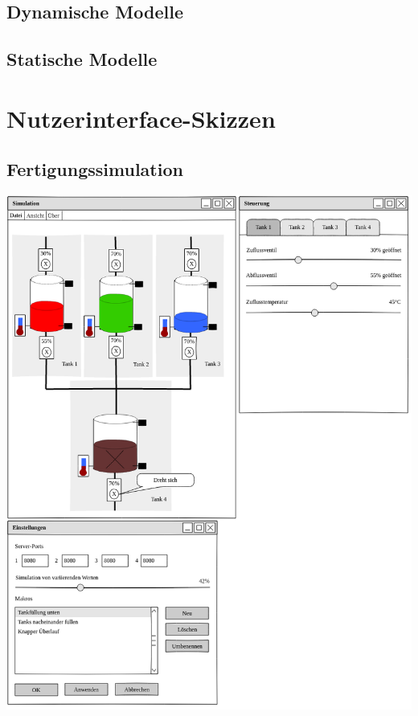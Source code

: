 \documentclass[parskip=full]{scrartcl}
\begin{document}
\subsection{Dynamische Modelle}
\Blindtext[1]

\subsection{Statische Modelle}
\Blindtext[1]

\section{Nutzerinterface-Skizzen}
\subsection{Fertigungssimulation}
\includegraphics[scale=0.5]{media/ui-sketch-server.png}
\end{document}
